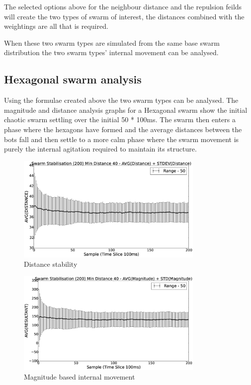 \documentclass[10pt,journal,letterpaper,twoside]{IEEEtran}
\newcommand{\swarmA}{Hexagonal}
\newcommand{\stability}{internal movement}
\begin{document}
The selected options above for the neighbour distance and the repulsion feilds will create the two types of swarm of interest, the distances combined with the weightings are all that is required.

When these two swarm types are simulated from the same base swarm distribution the two swarm types' \stability{} can be analysed.


\subsection{\swarmA{} swarm analysis}

Using the formulae created above the two swarm types can be analysed. The magnitude and distance analysis graphs for a \swarmA{} swarm show the initial chaotic swarm settling over the initial 50 * 100ms. The swarm then enters a phase where the hexagons have formed and the average distances between the bots fall and then settle to a more calm phase where the swarm movement is purely the internal agitation required to maintain its structure.

\begin{figure}[H]
\begin{center}
\includegraphics[width=9cm]{figures/StabilityDistanceSwarm40-50}
\end{center}
\caption{Distance stability\label{methods:StabilityDistanceSwarm40-50}}
\end{figure}

\begin{figure}[H]
\begin{center}
\includegraphics[width=9cm]{figures/StabilityMagnitudeSwarm40-50}
\end{center}
\caption{Magnitude based \stability{}\label{methods:StabilityMagnitudeSwarm40-50}}
\end{figure}
\end{document}
